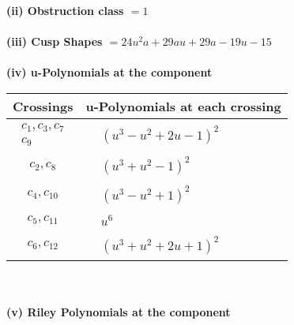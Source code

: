 \documentclass[1p]{elsarticle_modified}
\theoremstyle{definition}
\begin{document}
\flushleft \textbf{(ii) Obstruction class $= 1$}\\~\\
\flushleft \textbf{(iii) Cusp Shapes $= 24 u^2 a+29 a u+29 a-19 u-15$}\\~\\
\newpage\renewcommand{\arraystretch}{1}
\flushleft \textbf{(iv) u-Polynomials at the component}\newline \\
\begin{tabular}{m{50pt}|m{274pt}}
Crossings & \hspace{64pt}u-Polynomials at each crossing \\
\hline $$\begin{aligned}c_{1},c_{3},c_{7}\\c_{9}\end{aligned}$$&$\begin{aligned}
&(u^3- u^2+2 u-1)^2
\end{aligned}$\\
\hline $$\begin{aligned}c_{2},c_{8}\end{aligned}$$&$\begin{aligned}
&(u^3+u^2-1)^2
\end{aligned}$\\
\hline $$\begin{aligned}c_{4},c_{10}\end{aligned}$$&$\begin{aligned}
&(u^3- u^2+1)^2
\end{aligned}$\\
\hline $$\begin{aligned}c_{5},c_{11}\end{aligned}$$&$\begin{aligned}
&u^6
\end{aligned}$\\
\hline $$\begin{aligned}c_{6},c_{12}\end{aligned}$$&$\begin{aligned}
&(u^3+u^2+2 u+1)^2
\end{aligned}$\\
\hline
\end{tabular}\\~\\
\newpage\renewcommand{\arraystretch}{1}
\flushleft \textbf{(v) Riley Polynomials at the component}\newline \\
\end{document}
